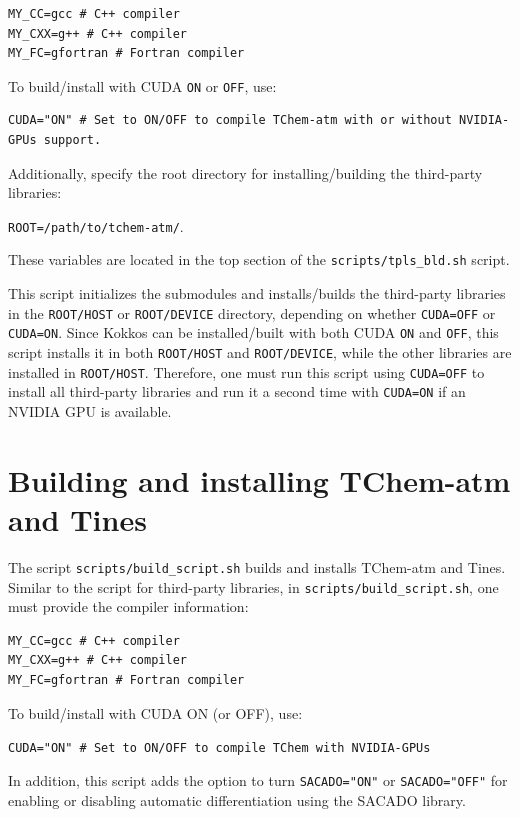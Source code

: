 \documentclass[report, 12pt]{SANDreport}
\begin{document}
\begin{verbatim}
MY_CC=gcc # C++ compiler
MY_CXX=g++ # C++ compiler
MY_FC=gfortran # Fortran compiler
\end{verbatim}

To build/install with CUDA \verb|ON| or \verb|OFF|, use:

\begin{verbatim}
CUDA="ON" # Set to ON/OFF to compile TChem-atm with or without NVIDIA-GPUs support.
\end{verbatim}

Additionally, specify the root directory for installing/building the third-party libraries:

\verb|ROOT=/path/to/tchem-atm/|.

These variables are located in the top section of the \verb|scripts/tpls_bld.sh| script.

This script initializes the submodules and installs/builds the third-party libraries in the \verb|ROOT/HOST| or \verb|ROOT/DEVICE| directory, depending on whether \verb|CUDA=OFF| or \verb|CUDA=ON|. Since Kokkos can be installed/built with both CUDA \verb|ON| and \verb|OFF|, this script installs it in both \verb|ROOT/HOST| and \verb|ROOT/DEVICE|, while the other libraries are installed in \verb|ROOT/HOST|. Therefore, one must run this script using \verb|CUDA=OFF| to install all third-party libraries and run it a second time with \verb|CUDA=ON| if an NVIDIA GPU is available.

\section{Building and installing TChem-atm and Tines}

The script \verb|scripts/build_script.sh| builds and installs TChem-atm and Tines. Similar to the script for third-party libraries, in \verb|scripts/build_script.sh|, one must provide the compiler information:

\begin{verbatim}
MY_CC=gcc # C++ compiler
MY_CXX=g++ # C++ compiler
MY_FC=gfortran # Fortran compiler
\end{verbatim}

To build/install with CUDA ON (or OFF), use:

\verb|CUDA="ON" # Set to ON/OFF to compile TChem with NVIDIA-GPUs|

In addition, this script adds the option to turn \verb|SACADO="ON"| or \verb|SACADO="OFF"| for enabling or disabling automatic differentiation using the SACADO library.
\end{document}
